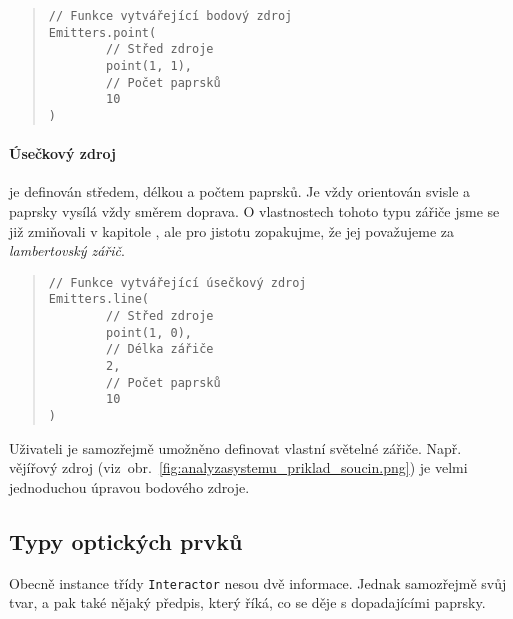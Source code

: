 \begin{minipage}{\textwidth}\begin{quote}\begin{lstlisting}
// Funkce vytvářející bodový zdroj
Emitters.point(
        // Střed zdroje
        point(1, 1),
        // Počet paprsků
        10
)
\end{lstlisting}\end{quote}\end{minipage}


\paragraph{Úsečkový zdroj} je definován středem, délkou a počtem paprsků. Je vždy orientován svisle a paprsky vysílá vždy směrem doprava. O vlastnostech tohoto typu zářiče jsme se již zmiňovali v kapitole , ale pro jistotu zopakujme, že jej považujeme za \emph{lambertovský zářič}. \parencite{fotometrie}

\begin{minipage}{\textwidth}\begin{quote}\begin{lstlisting}
// Funkce vytvářející úsečkový zdroj
Emitters.line(
        // Střed zdroje
        point(1, 0),
        // Délka zářiče
        2,
        // Počet paprsků
        10
)
\end{lstlisting}\end{quote}\end{minipage}


Uživateli je samozřejmě umožněno definovat vlastní světelné zářiče. Např. vějířový zdroj (viz~obr.~\ref{fig:analyzasystemu_priklad_soucin.png}) je velmi jednoduchou úpravou bodového zdroje.


\subsection{Typy optických prvků}

Obecně instance třídy \texttt{Interactor} nesou dvě informace. Jednak samozřejmě svůj tvar, a pak také nějaký předpis, který říká, co se děje s dopadajícími paprsky.

